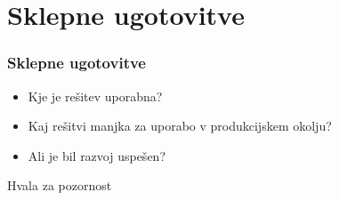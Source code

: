 \documentclass{beamer}
\begin{document}
\section{Sklepne ugotovitve}
\begin{frame}
\frametitle{Sklepne ugotovitve}
    \begin{itemize}
        \item Kje je rešitev uporabna?
        \item Kaj rešitvi manjka za uporabo v produkcijskem okolju?
        \item Ali je bil razvoj uspešen?
    \end{itemize}
\end{frame}


\begin{frame}
\Huge{\centerline{Hvala za pozornost}}
\end{frame}

\end{document}
